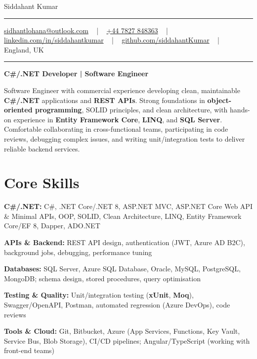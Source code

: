 \documentclass[letterpaper,10pt]{article}
\newcommand{\documentTitle}[2]{
  \begin{center}
    \vspace*{-0.3in}
    {\Huge\color{accentTitle} #1}
    \vspace{8pt}
    {\color{accentLine} \hrule}
    \vspace{2pt}
    \footnotesize{#2}
    \vspace{2pt}
    {\color{accentLine} \hrule}
  \end{center}
}
\newenvironment{resume_list}{
  \vspace{-7pt}
  \begin{itemize}[itemsep=-2px, parsep=1pt, leftmargin=30pt]
}{
  \end{itemize}
}
\begin{document}
\documentTitle{Siddahant Kumar}{
\vspace{0.1cm}
\href{mailto:sidhantlohana@outlook.com}{sidhantlohana@outlook.com} ~ | ~
\href{tel:+447827848363}{+44 7827 848363} ~ | ~
\href{https://www.linkedin.com/in/siddahantkumar/}{linkedin.com/in/siddahantkumar} ~ | ~
\href{https://github.com/siddahantKumar}{github.com/siddahantKumar} ~ | ~
England, UK
}

\begin{center}
\textbf{C\#/.NET Developer | Software Engineer}
\end{center}

Software Engineer with commercial experience developing clean, maintainable \textbf{C\#/.NET} applications and \textbf{REST APIs}. Strong foundations in \textbf{object-oriented programming}, SOLID principles, and clean architecture, with hands-on experience in \textbf{Entity Framework Core}, \textbf{LINQ}, and \textbf{SQL Server}. Comfortable collaborating in cross-functional teams, participating in code reviews, debugging complex issues, and writing unit/integration tests to deliver reliable backend services.


\section{Core Skills}

\begin{resume_list}
    \item \textbf{C\#/.NET:} C\#, .NET Core/.NET 8, ASP.NET MVC, ASP.NET Core Web API \& Minimal APIs, OOP, SOLID, Clean Architecture, LINQ, Entity Framework Core/EF 8, Dapper, ADO.NET
    \item \textbf{APIs \& Backend:} REST API design, authentication (JWT, Azure AD B2C), background jobs, debugging, performance tuning
    \item \textbf{Databases:} SQL Server, Azure SQL Database, Oracle, MySQL, PostgreSQL, MongoDB; schema design, stored procedures, query optimisation
    \item \textbf{Testing \& Quality:} Unit/integration testing (\textbf{xUnit}, \textbf{Moq}), Swagger/OpenAPI, Postman, automated regression (Azure DevOps), code reviews
    \item \textbf{Tools \& Cloud:} Git, Bitbucket, Azure (App Services, Functions, Key Vault, Service Bus, Blob Storage), CI/CD pipelines; Angular/TypeScript (working with front-end teams)
\end{resume_list}
\end{document}
